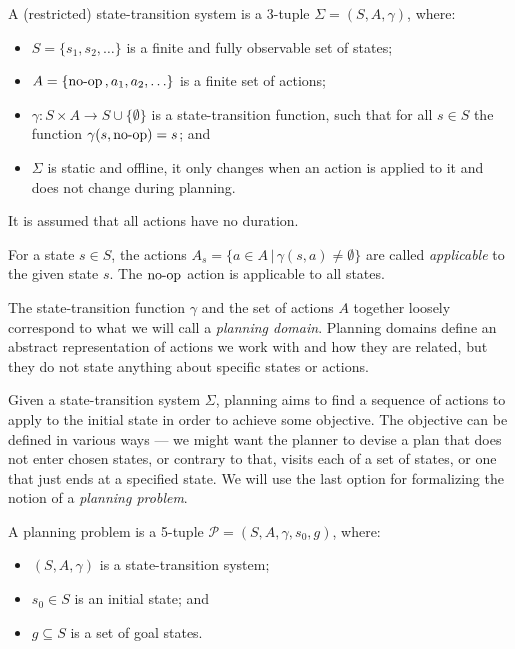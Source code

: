 \begin{defn}\label{defn:state-transition-sys}
A (restricted) state-transition system is a 3-tuple $\Sigma = (S, A, \gamma)$, where:
\begin{itemize}
\item $S = \{s_1, s_2, \ldots\}$ is a finite and fully observable set of states;
\item $A = \{\operatorname{\textrm{no-op}}{}, a_1, a_2, \ldots\}$ is a finite set of actions;
\item $\gamma: S \times A \to S \cup \{\emptyset\}$ is a state-transition function,
such that for all $s \in S$ the function $\gamma(s, \operatorname{\textrm{no-op}}) = s$; and
\item $\Sigma$ is static and offline,
it only changes when an action is applied to it and does not change during planning.
\end{itemize}
It is assumed that all actions have no duration.
\end{defn}

For a state $s \in S$, the actions $A_s = \{a \in A \,|\, \gamma(s, a) \neq \emptyset\}$ are called \textit{applicable}
to the given state $s$. The $\operatorname{\textrm{no-op}}$ action is applicable to all states.

The state-transition function $\gamma$ and the set of actions $A$ together loosely correspond to what we will call a \textit{planning domain}.
Planning domains define an abstract representation of actions we work with
and how they are related,
but they do not state anything about specific states or actions.

Given a state-transition system $\Sigma$, planning aims to find a
sequence of actions to apply to the initial state in order to achieve some objective.
The objective can be defined in various ways --- we might want the planner
to devise a plan that
does not enter chosen states, or contrary to that, visits each of a set of states,
or one that just ends at a specified state.
We will use the last option for formalizing the notion of a \textit{planning problem}.

\begin{defn}\label{defn:planning-problem}\citep[Part~I]{Ghallab2004}
A planning problem is a 5-tuple $\mathcal{P} = (S, A, \gamma, s_0, g)$, where:
\begin{itemize}
\item $(S, A, \gamma)$ is a state-transition system;
\item $s_0 \in S$ is an initial state; and
\item $g \subseteq S$ is a set of goal states.
\end{itemize}
\end{defn}

